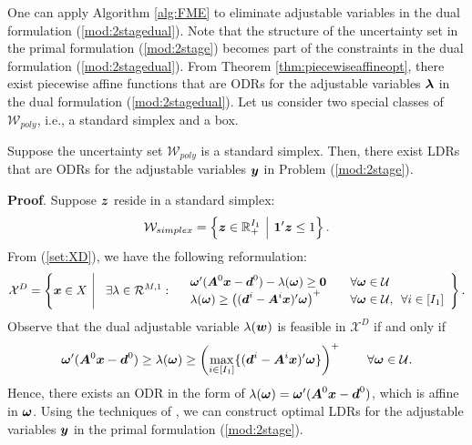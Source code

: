\documentclass[fleqn,mnsc,blindrev]{informs4}
\newcommand{\mb}[1]{\mbox{\boldmath \ensuremath{#1}}}
\begin{document}
	One can apply Algorithm \ref{alg:FME} to eliminate adjustable variables in the dual formulation (\ref{mod:2stagedual}). Note that the structure of the uncertainty set in the primal formulation (\ref{mod:2stage}) becomes part of the constraints in the dual formulation (\ref{mod:2stagedual}). From Theorem \ref{thm:piecewiseaffineopt}, there exist piecewise affine functions that are ODRs for the adjustable variables $\mb{\lambda}$ in the dual formulation (\ref{mod:2stagedual}). Let us consider two special classes of $\mathcal{W}_{poly}$, i.e., a standard simplex and a box.
	
	\begin{theorem} \label{thm:optsimplex}
		Suppose the uncertainty set $\mathcal{W}_{poly}$ is a standard simplex. Then, there exist LDRs that are ODRs for the adjustable variables $\mb{y}$ in Problem (\ref{mod:2stage}).
	\end{theorem}
	\textbf{Proof}. Suppose $\mb{z}$ reside in a standard simplex:
\begin{equation*}
	\mathcal{W}_{simplex} = \left\{ \mb{z}\in \mathbb{R}^{I_1}_+ \enskip \vline  \enskip \mb{1}'\mb{z} \le 1 \right\}. 
\end{equation*}
	From (\ref{set:XD}), we have the following reformulation:
\begin{equation*}
		\mathcal{X}^D=  \left\{ \mb{x} \in X \enskip \vline \enskip
		\enskip  \exists  \lambda \in \mathcal{R}^{M,1}: \begin{array}{lll}
			&  \mb{\omega}' (\mb{A}^0\mb{x}-\mb{d}^0) - \lambda(\mb{\omega}) \ge \mb{0}  & \quad \forall \mb{\omega} \in \mathcal{U} \\
			&\lambda(\mb{\omega}) \ge \left( (\mb{d}^i- \mb{A}^i\mb{x})'\mb{\omega}\right)^+   & \quad\forall \mb{\omega} \in \mathcal{U},  \enskip \forall i\in [I_1]
		\end{array}
		\right\}.
\end{equation*}
		Observe that the dual adjustable variable $\lambda(\mb{w})$ is feasible in $\mathcal{X}^D$ if and only if 
\begin{equation*}		\mb{\omega}' (\mb{A}^0\mb{x}-\mb{d}^0) \ge \lambda(\mb{\omega}) \geq \left(\max_{i \in[I_1]}\{(\mb{d}^i- \mb{A}^i\mb{x})'\mb{\omega}\}\right)^+ \qquad \forall \mb{\omega} \in \mathcal{U}.
\end{equation*}
		Hence, there exists an ODR in the form of $\lambda(\mb{\omega}) =  \mb{\omega}' (\mb{A}^0\mb{x}-\mb{d}^0)$, which is affine in $\mb{\omega}$. Using the techniques of \cite[Theorem 2]{bd16}, we can construct optimal LDRs for the adjustable variables $\mb{y}$ in the primal formulation (\ref{mod:2stage}).
	 \hfill \Halmos\\
	
\end{document}
